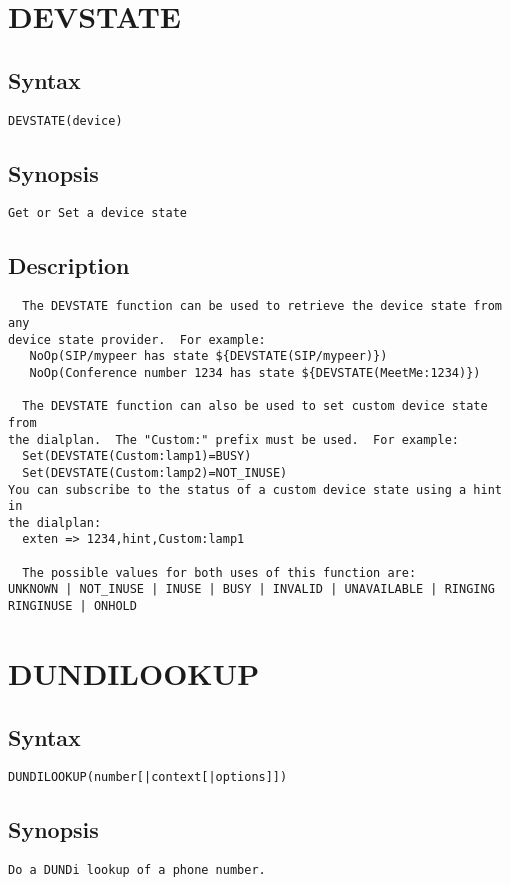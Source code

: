 \section{DEVSTATE}
\subsection{Syntax}
\begin{verbatim}
DEVSTATE(device)
\end{verbatim}
\subsection{Synopsis}
\begin{verbatim}
Get or Set a device state
\end{verbatim}
\subsection{Description}
\begin{verbatim}
  The DEVSTATE function can be used to retrieve the device state from any
device state provider.  For example:
   NoOp(SIP/mypeer has state ${DEVSTATE(SIP/mypeer)})
   NoOp(Conference number 1234 has state ${DEVSTATE(MeetMe:1234)})

  The DEVSTATE function can also be used to set custom device state from
the dialplan.  The "Custom:" prefix must be used.  For example:
  Set(DEVSTATE(Custom:lamp1)=BUSY)
  Set(DEVSTATE(Custom:lamp2)=NOT_INUSE)
You can subscribe to the status of a custom device state using a hint in
the dialplan:
  exten => 1234,hint,Custom:lamp1

  The possible values for both uses of this function are:
UNKNOWN | NOT_INUSE | INUSE | BUSY | INVALID | UNAVAILABLE | RINGING
RINGINUSE | ONHOLD

\end{verbatim}


\section{DUNDILOOKUP}
\subsection{Syntax}
\begin{verbatim}
DUNDILOOKUP(number[|context[|options]])
\end{verbatim}
\subsection{Synopsis}
\begin{verbatim}
Do a DUNDi lookup of a phone number.
\end{verbatim}

